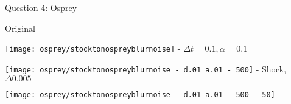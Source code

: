 \newpage
\item Question 4: Osprey
\begin{center}
    Original

    \texttt{[image: osprey/stocktonospreyblurnoise]}
     - $\Delta t = 0.1, \alpha = 0.1$

    \texttt{[image: osprey/stocktonospreyblurnoise - d.01 a.01 - 500]}
     - Shock, $\Delta 0.005$

    \texttt{[image: osprey/stocktonospreyblurnoise - d.01 a.01 - 500 - 50]}
\end{center}

